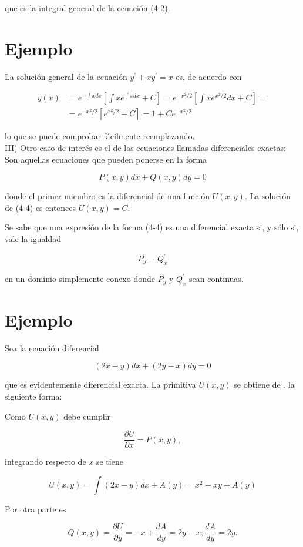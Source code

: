 \documentclass[10pt]{article}
\theoremstyle{plain}
\theoremstyle{definition}
\theoremstyle{remark}
\begin{document}
que es la integral general de la ecuación (4-2).

\section*{Ejemplo}
La solución general de la ecuación $y^{\prime}+x y^{\prime}=x$ es, de acuerdo con

$$
\begin{aligned}
y(x) & =e^{-\int x d x}\left[\int x e^{\int x d x}+C\right]=e^{-x^{2} / 2}\left[\int x e^{x^{2} / 2} d x+C\right]= \\
& =e^{-x^{2} / 2}\left[e^{x^{2} / 2}+C\right]=1+C e^{-x^{2} / 2}
\end{aligned}
$$

lo que se puede comprobar fácilmente reemplazando.\\
III) Otro caso de interés es el de las ecuaciones llamadas diferenciales exactas: Son aquellas ecuaciones que pueden ponerse en la forma


\begin{equation*}
P(x, y) d x+Q(x, y) d y=0 \tag{4-4}
\end{equation*}


donde el primer miembro es la diferencial de una función $U(x, y)$. La solución de (4-4) es entonces $U(x, y)=C$.

Se sabe que una expresión de la forma (4-4) es una diferencial exacta si, y sólo si, vale la igualdad

$$
P_{y}^{\prime}=Q_{x}^{\prime}
$$

en un dominio simplemente conexo donde $P_{y}^{\prime}$ y $Q_{x}^{\prime}$ sean continuas.

\section*{Ejemplo}
Sea la ecuación diferencial

$$
(2 x-y) d x+(2 y-x) d y=0
$$

que es evidentemente diferencial exacta. La primitiva $U(x, y)$ se obtiene de . la siguiente forma:

Como $U(x, y)$ debe cumplir

$$
\frac{\partial U}{\partial x}=P(x, y),
$$

integrando respecto de $x$ se tiene

$$
U(x, y)=\int(2 x-y) d x+A(y)=x^{2}-x y+A(y)
$$

Por otra parte es

$$
Q(x, y)=\frac{\partial U}{\partial y}=-x+\frac{d A}{d y}=2 y-x ; \frac{d A}{d y}=2 y .
$$
\end{document}
